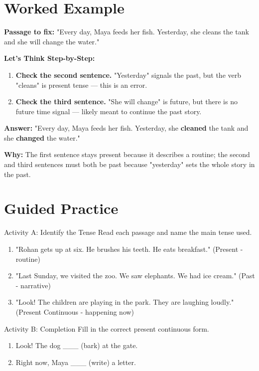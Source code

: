 \section{Worked Example}
\begin{examplebox}
\textbf{Passage to fix:} "Every day, Maya feeds her fish. Yesterday, she cleans the tank and she will change the water."

\textbf{Let's Think Step-by-Step:}
\begin{enumerate}
    \item \textbf{Check the second sentence.} "Yesterday" signals the past, but the verb "cleans" is present tense — this is an error.
    \item \textbf{Check the third sentence.} "She will change" is future, but there is no future time signal — likely meant to continue the past story.
\end{enumerate}

\textbf{Answer:} "Every day, Maya feeds her fish. Yesterday, she \textbf{cleaned} the tank and she \textbf{changed} the water."

\textbf{Why:} The first sentence stays present because it describes a routine; the second and third sentences must both be past because "yesterday" sets the whole story in the past.
\end{examplebox}

\section{Guided Practice}
\begin{activitybox}{Activity A: Identify the Tense}
Read each passage and name the main tense used.
\begin{enumerate}
    \item "Rohan gets up at six. He brushes his teeth. He eats breakfast." (Present - routine)
    \item "Last Sunday, we visited the zoo. We saw elephants. We had ice cream." (Past - narrative)
    \item "Look! The children are playing in the park. They are laughing loudly." (Present Continuous - happening now)
\end{enumerate}
\end{activitybox}

\begin{activitybox}{Activity B: Completion}
Fill in the correct present continuous form.
\begin{enumerate}
    \item Look! The dog \_\_\_ (bark) at the gate.
    \item Right now, Maya \_\_\_ (write) a letter.
\end{enumerate}
\end{activitybox}

